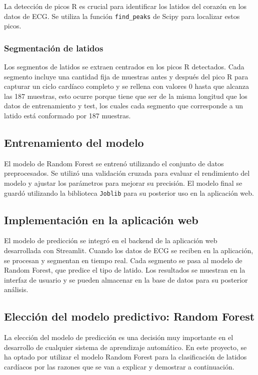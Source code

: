 La detección de picos R es crucial para identificar los latidos del corazón en los datos de ECG. Se utiliza la función \texttt{find\_peaks} de Scipy para localizar estos picos.

\subsubsection{Segmentación de latidos}

Los segmentos de latidos se extraen centrados en los picos R detectados. Cada segmento incluye una cantidad fija de muestras antes y después del pico R para capturar un ciclo cardíaco completo y se rellena con valores 0 hasta que alcanza las 187 muestras, esto ocurre porque tiene que ser de la misma longitud que los datos de entrenamiento y test, los cuales cada segmento que corresponde a un latido está conformado por 187 muestras.

\subsection{Entrenamiento del modelo}

El modelo de Random Forest se entrenó utilizando el conjunto de datos preprocesados. Se utilizó una validación cruzada para evaluar el rendimiento del modelo y ajustar los parámetros para mejorar su precisión. El modelo final se guardó utilizando la biblioteca \texttt{Joblib} para su posterior uso en la aplicación web.

\subsection{Implementación en la aplicación web}

El modelo de predicción se integró en el backend de la aplicación web desarrollada con Streamlit. Cuando los datos de ECG se reciben en la aplicación, se procesan y segmentan en tiempo real. Cada segmento se pasa al modelo de Random Forest, que predice el tipo de latido. Los resultados se muestran en la interfaz de usuario y se pueden almacenar en la base de datos para su posterior análisis.

\subsection{Elección del modelo predictivo: Random Forest}

La elección del modelo de predicción es una decisión muy importante en el desarrollo de cualquier sistema de aprendizaje automático. En este proyecto, se ha optado por utilizar el modelo Random Forest para la clasificación de latidos cardíacos por las razones que se van a explicar y demostrar a continuación.

